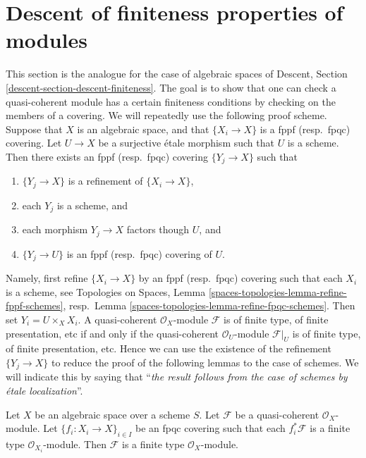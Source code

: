 \section{Descent of finiteness properties of modules}
\label{section-descent-finiteness}

\noindent
This section is the analogue for the case of algebraic spaces of
Descent, Section \ref{descent-section-descent-finiteness}.
The goal is to show that one can check a quasi-coherent module
has a certain finiteness conditions by checking on the members of
a covering. We will repeatedly use the following proof scheme.
Suppose that $X$ is an algebraic space, and that $\{X_i \to X\}$
is a fppf (resp.\ fpqc) covering. Let $U \to X$ be a surjective
\'etale morphism such that $U$ is a scheme. Then there exists an
fppf (resp.\ fpqc) covering $\{Y_j \to X\}$ such that
\begin{enumerate}
\item $\{Y_j \to X\}$ is a refinement of $\{X_i \to X\}$,
\item each $Y_j$ is a scheme, and
\item each morphism $Y_j \to X$ factors though $U$, and
\item $\{Y_j \to U\}$ is an fppf (resp.\ fpqc) covering of $U$.
\end{enumerate}
Namely, first refine $\{X_i \to X\}$ by an fppf (resp.\ fpqc)
covering such that each $X_i$ is a scheme, see
Topologies on Spaces, Lemma \ref{spaces-topologies-lemma-refine-fppf-schemes},
resp.\ Lemma \ref{spaces-topologies-lemma-refine-fpqc-schemes}.
Then set $Y_i = U \times_X X_i$. A quasi-coherent
$\mathcal{O}_X$-module $\mathcal{F}$ is of finite type, of
finite presentation, etc if and only if the quasi-coherent
$\mathcal{O}_U$-module $\mathcal{F}|_U$ is of finite type, of
finite presentation, etc. Hence we can use the existence of the
refinement $\{Y_j \to X\}$ to reduce the proof of the following
lemmas to the case of schemes. We will indicate this by saying
that ``{\it the result follows from the case of schemes by
\'etale localization}''.

\begin{lemma}
\label{lemma-finite-type-descends}
Let $X$ be an algebraic space over a scheme $S$.
Let $\mathcal{F}$ be a quasi-coherent $\mathcal{O}_X$-module.
Let $\{f_i : X_i \to X\}_{i \in I}$ be an fpqc covering such that
each $f_i^*\mathcal{F}$ is a finite type $\mathcal{O}_{X_i}$-module.
Then $\mathcal{F}$ is a finite type $\mathcal{O}_X$-module.
\end{lemma}


